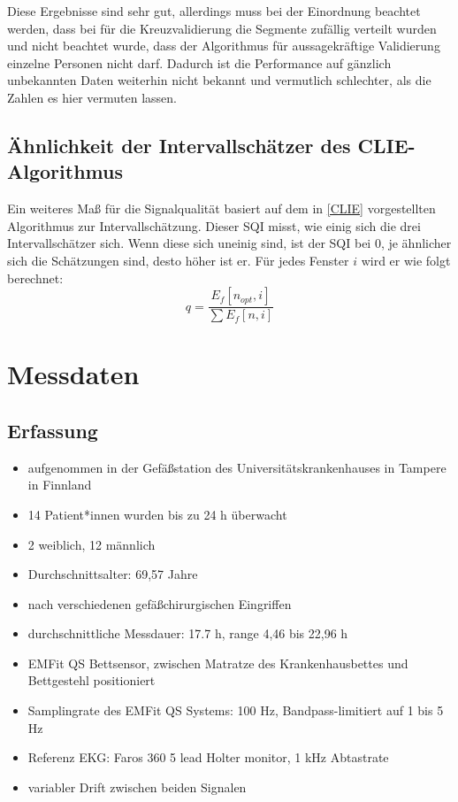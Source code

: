 	Diese Ergebnisse sind sehr gut, allerdings muss bei der Einordnung beachtet werden, dass bei für die Kreuzvalidierung die Segmente zufällig verteilt wurden und nicht beachtet wurde, dass der Algorithmus für aussagekräftige Validierung einzelne Personen nicht darf. Dadurch ist die Performance auf gänzlich unbekannten Daten weiterhin nicht bekannt und vermutlich schlechter, als die Zahlen es hier vermuten lassen.
	
	\subsection{Ähnlichkeit der Intervallschätzer des CLIE-Algorithmus}
	
	Ein weiteres Maß für die Signalqualität basiert auf dem in \ref{CLIE} vorgestellten Algorithmus zur Intervallschätzung. Dieser \acl{SQI} misst, wie einig sich die drei Intervallschätzer sich. Wenn diese sich uneinig sind, ist der \ac{SQI} bei 0, je ähnlicher sich die Schätzungen sind, desto höher ist er. Für jedes Fenster $i$ wird er wie folgt berechnet: \[ q = \frac{E_f[n_{opt}, i]}{\sum E_f[n, i]} \]
	

\section{Messdaten}
	
	\subsection{Erfassung}
	
	\begin{itemize}
		\item aufgenommen in der Gefäßstation des Universitätskrankenhauses in Tampere in Finnland
		\item 14 Patient*innen wurden bis zu 24 h überwacht
		\item 2 weiblich, 12 männlich
		\item Durchschnittsalter: 69,57 Jahre
		\item nach verschiedenen gefäßchirurgischen Eingriffen
		\item durchschnittliche Messdauer: 17.7 h, range 4,46 bis 22,96 h
		\item EMFit QS Bettsensor, zwischen Matratze des Krankenhausbettes und Bettgestehl positioniert
		\item Samplingrate des EMFit QS Systems: 100 Hz, Bandpass-limitiert auf 1 bis 5 Hz
		\item Referenz EKG: Faros 360 5 lead Holter monitor, 1 kHz Abtastrate
		\item variabler Drift zwischen beiden Signalen %
	\end{itemize}
	
